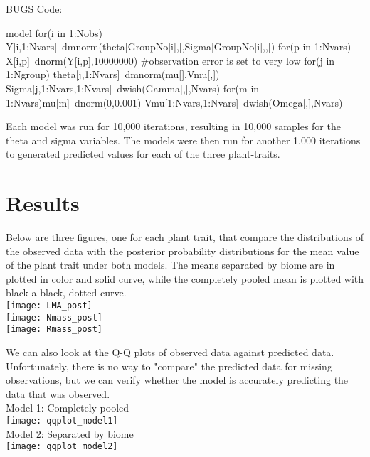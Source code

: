 \documentclass[11pt]{article}
\theoremstyle{definition}
\theoremstyle{remark}
\theoremstyle{definition}
\begin{document}
BUGS Code: 

\begin{code}
  model{
    for(i in 1:Nobs){
      Y[i,1:Nvars]~dmnorm(theta[GroupNo[i],],Sigma[GroupNo[i],,])
      for(p in 1:Nvars){
        X[i,p]~dnorm(Y[i,p],10000000) #observation error is set to very low
      }
    }
    for(j in 1:Ngroup){
      theta[j,1:Nvars]~dmnorm(mu[],Vmu[,])
      Sigma[j,1:Nvars,1:Nvars]~dwish(Gamma[,],Nvars)
    }
    for(m in 1:Nvars){mu[m]~dnorm(0,0.001)}
    Vmu[1:Nvars,1:Nvars]~dwish(Omega[,],Nvars)
  }
 \end{code}

Each model was run for 10,000 iterations, resulting in 10,000 samples for the theta and sigma variables. The models were then run for another 1,000 iterations to generated predicted values for each of the three plant-traits. 

\newpage
\section{Results}

Below are three figures, one for each plant trait, that compare the distributions of the observed data with the posterior probability distributions for the mean value of the plant trait under both models. The means separated by biome are in plotted in color and solid curve, while the completely pooled mean is plotted with black a black, dotted curve. \\

\texttt{[image: LMA\_post]}\\
\newpage
\texttt{[image: Nmass\_post]}\\
\texttt{[image: Rmass\_post]}
\newpage

We can also look at the Q-Q plots of observed data against predicted data. Unfortunately, there is no way to "compare" the predicted data for missing observations, but we can verify whether the model is accurately predicting the data that was observed. \\


Model 1: Completely pooled\\

\texttt{[image: qqplot\_model1]}\\
\newpage
Model 2: Separated by biome\\

\texttt{[image: qqplot\_model2]}
\end{document}
